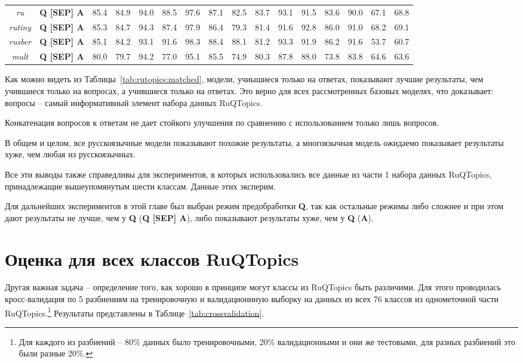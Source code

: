 \begin{table*}
{\begin{tabular}{|c|c||c|c|c|c|c|c|c|c|c|c|c|c|c|c|}
\textit{ru} &  \textbf{Q [SEP] A} & 85.4 & 84.9 & 94.0 & 88.5 & 97.6 & 87.1 & 82.5 & 83.7 & 93.1 & 91.5 & 83.6 & 90.0 & 67.1 & 68.8\\ %
\textit{rutiny} &  \textbf{Q [SEP] A} & 85.3 & 84.7 & 94.3 & 87.4 & 97.9 & 86.4 & 79.3 & 81.4 & 91.6 & 92.8 & 86.0 & 91.0 & 68.2 & 69.1\\ %
\textit{rusber} &  \textbf{Q [SEP] A} & 85.1 & 84.2 & 93.1 & 91.6 & 98.3 & 88.4 & 88.1 & 81.2 & 93.3 & 91.9 & 86.2 & 91.6 & 53.7 & 60.7\\ %
\textit{mult} &  \textbf{Q [SEP] A} & 80.0 & 79.7 & 94.2 & 77.0 & 95.1 & 85.5 & 74.9 & 80.3 & 87.8 & 88.0 & 73.8 & 83.8 & 64.6 & 63.6\\ \hline
\end{tabular}
}
\end{table*}

Как можно видеть из Таблицы~\ref{tab:rutopics:matched}, модели, учиышиеся только на ответах, показывают лучшие результаты, чем учившиеся только на вопросах, а учившиеся только на ответах. Это верно для всех рассмотренных базовых моделях, что доказывает: вопросы -- самый информативный элемент набора данных {RuQTopics}. 

Конкатенация вопросов к ответам не дает стойкого улучшения по сравнению с использованием только лишь вопросов. 

В общем и целом, все русскоязычные модели показывают похожие результаты, а многоязычная модель ожидаемо показывает результаты хуже, чем любая из русскоязычных. 

Все эти выводы также справедливы для экспериментов, в которых использовались все данные из части 1 набора данных {RuQTopics}, принадлежащие вышеупомянутым шести классам. Данные этих эксперим.

Для дальнейших экспериментов в этой главе был выбран режим предобработки \textbf{Q}, так как остальные режимы либо сложнее и при этом дают результаты не лучше, чем у \textbf{Q} (\textbf{Q [SEP] A}), либо показывают результаты хуже, чем у \textbf{Q} (\textbf{A}).

\section{Оценка для всех классов {RuQTopics}}

Другая важная задача -- определение того, как хорошо в принципе могут классы из {RuQTopics} быть различими. Для этого проводилась кросс-валидация по 5 разбиениям на тренировочную и валидационнную выборку на данных из всех 76 классов из однометочной части {RuQTopics}.\footnote{Для каждого из разбиений -- 80\% данных было тренировочными, 20\% валидационными и они же тестовыми, для разных разбиений это были разные 20\%.} Результаты представлены в Таблице~\ref{tab:crossvalidation}.


